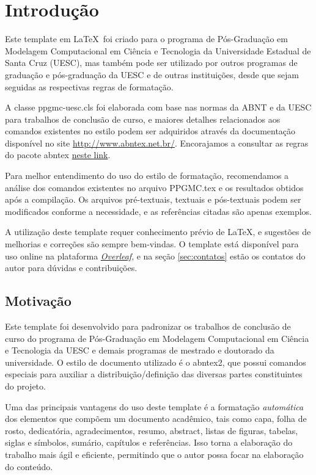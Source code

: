 %
%

\chapter{Introdução}\label{chap:introducao}
Este template em \LaTeX \ foi criado para o programa de Pós-Graduação em Modelagem Computacional em Ciência e Tecnologia da Universidade Estadual de Santa Cruz (UESC), mas também pode ser utilizado por outros programas de graduação e pós-graduação da UESC e de outras instituições, desde que sejam seguidas as respectivas regras de formatação.

A classe {\ttfamily ppgmc-uesc.cls} foi elaborada com base nas normas da ABNT e da UESC para trabalhos de conclusão de curso, e maiores detalhes relacionados aos comandos existentes no estilo podem ser adquiridos através da documentação disponível no site \href{http://www.abntex.net.br/}{http://www.abntex.net.br/}. Encorajamos a consultar as regras do pacote abntex  \href{http://linorg.usp.br/CTAN/macros/latex/contrib/abntex2/doc/abntex2.pdf}{neste link}.

Para melhor entendimento do uso do estilo de formatação, recomendamos a análise dos comandos existentes no arquivo {\ttfamily PPGMC.tex} e os resultados obtidos após a compilação. Os arquivos pré-textuais, textuais e pós-textuais podem ser modificados conforme a necessidade, e as referências citadas são apenas exemplos.

A utilização deste template requer conhecimento prévio de \LaTeX, e sugestões de melhorias e correções são sempre bem-vindas. O template está disponível para uso online na plataforma \href{https://pt.overleaf.com}{\textit{Overleaf}}, e na seção \ref{sec:contatos} estão os contatos do autor para dúvidas e contribuições.

\section{Motivação}
\label{sec:motivacao}

Este template foi desenvolvido para padronizar os trabalhos de conclusão de curso do programa de Pós-Graduação em Modelagem Computacional em Ciência e Tecnologia da UESC e demais programas de mestrado e doutorado da universidade. O estilo de documento utilizado é o {\ttfamily abntex2}, que possui comandos especiais para auxiliar a distribuição/definição das diversas partes constituintes do projeto.

Uma das principais vantagens do uso deste template é a formatação \textit{automática} dos elementos que compõem um documento acadêmico, tais como capa, folha de rosto, dedicatória, agradecimentos, resumo, abstract, listas de figuras, tabelas, siglas e símbolos, sumário, capítulos e referências. Isso torna a elaboração do trabalho mais ágil e eficiente, permitindo que o autor possa focar na elaboração do conteúdo.

